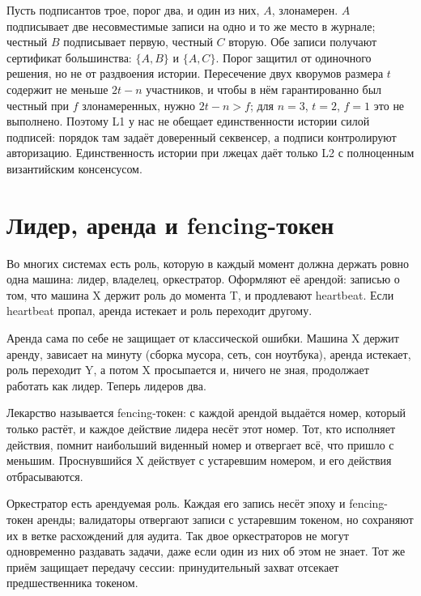 \begin{likbez}
Пусть подписантов трое, порог два, и один из них, $A$, злонамерен. $A$ подписывает две несовместимые записи на одно и то же место в журнале; честный $B$ подписывает первую, честный $C$ вторую. Обе записи получают сертификат большинства: $\{A, B\}$ и $\{A, C\}$. Порог защитил от одиночного решения, но не от раздвоения истории. Пересечение двух кворумов размера $t$ содержит не меньше $2t - n$ участников, и чтобы в нём гарантированно был честный при $f$ злонамеренных, нужно $2t - n > f$; для $n = 3$, $t = 2$, $f = 1$ это не выполнено. Поэтому L1 у нас не обещает единственности истории силой подписей: порядок там задаёт доверенный секвенсер, а подписи контролируют авторизацию. Единственность истории при лжецах даёт только L2 с полноценным византийским консенсусом.
\end{likbez}

\section{Лидер, аренда и fencing-токен}

Во многих системах есть роль, которую в каждый момент должна держать ровно одна машина: лидер, владелец, оркестратор. Оформляют её арендой: записью о том, что машина X держит роль до момента T, и продлевают heartbeat. Если heartbeat пропал, аренда истекает и роль переходит другому.

Аренда сама по себе не защищает от классической ошибки. Машина X держит аренду, зависает на минуту (сборка мусора, сеть, сон ноутбука), аренда истекает, роль переходит Y, а потом X просыпается и, ничего не зная, продолжает работать как лидер. Теперь лидеров два.

Лекарство называется fencing-токен: с каждой арендой выдаётся номер, который только растёт, и каждое действие лидера несёт этот номер. Тот, кто исполняет действия, помнит наибольший виденный номер и отвергает всё, что пришло с меньшим. Проснувшийся X действует с устаревшим номером, и его действия отбрасываются.

\begin{likbez}
Оркестратор есть арендуемая роль. Каждая его запись несёт эпоху и fencing-токен аренды; валидаторы отвергают записи с устаревшим токеном, но сохраняют их в ветке расхождений для аудита. Так двое оркестраторов не могут одновременно раздавать задачи, даже если один из них об этом не знает. Тот же приём защищает передачу сессии: принудительный захват отсекает предшественника токеном.
\end{likbez}

